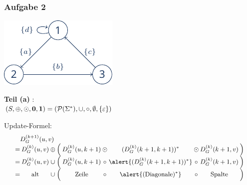 \documentclass{beamer}
\begin{document}


\begin{frame} \frametitle{Aufgabe 2}
	\begin{minipage}{\dimexpr0.5\linewidth-\fboxrule-\fboxsep}
		\includegraphics[width=\linewidth]{./tut12_task2-graph.pdf}
	\end{minipage} 
	\pause
	\begin{minipage}{\dimexpr0.5\linewidth-\fboxrule-\fboxsep}
		\centering
		\textbf{Teil (a)} : \\
		$(S, \oplus, \odot, \mathbf{0}, \mathbf{1}) = (\mathcal{P}(\Sigma^\ast), \cup, \circ, \emptyset, \left\{ \varepsilon \right\})$
	\end{minipage}

	\hspace{1em} \pause
	
	Update-Formel: 
	\begin{equation*}
	\small
	\setlength{\arraycolsep}{1pt}
		\begin{array}{rccrcccccr}
			\mathrlap{D_G^{(k+1)}(u,v)}\\
			=& D_G^{(k)}(u,v) &\oplus& \Big( & D_G^{(k)}(u,k+1) &\odot& (D_G^{(k)}(k+1,k+1))^\ast &\odot& D_G^{(k)}(k+1,v) & \Big) \\
			=& D_G^{(k)}(u,v) &\cup& \Big( & D_G^{(k)}(u,k+1) &\circ& \alert{(D_G^{(k)}(k+1,k+1))^\ast} &\circ& D_G^{(k)}(k+1,v) & \Big) \\
			=& \text{alt} &\cup& \Big(& \text{Zeile} &\circ& \alert{(\text{Diagonale})^\ast} &\circ& \text{Spalte} & \Big)
		\end{array}
	\end{equation*}
\end{frame}
\end{document}
